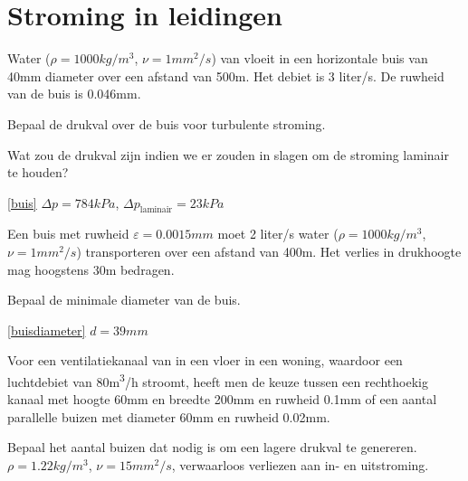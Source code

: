 \chapter{Stroming in leidingen}
\label{sec:Stroming in leidingen}
\begin{toepassing}
	\label{buis}
Water ($\rho=1000\unit{kg/m^3}$, $\nu=1\unit{mm^2/s}$) van vloeit in een horizontale buis van \unit{40}{mm} diameter over een afstand van 500m. Het debiet is 3 liter/s.  De ruwheid van de buis is 0.046mm.
		
Bepaal de drukval over de buis voor turbulente stroming.
		
Wat zou de drukval zijn indien we er zouden in slagen om de stroming laminair te houden?
\end{toepassing}
\begin{antwoord}{\ref{buis}}
	$\Delta p = 784\unit{kPa}$, $\Delta p_{\text{laminair}} = 23\unit{kPa}$
\end{antwoord}
\begin{toepassing}[*]
	\label{buisdiameter}
Een buis met ruwheid $\varepsilon = 0.0015\unit{mm}$ moet 2 liter/s water ($\rho=1000\unit{kg/m^3}$, $\nu=1\unit{mm^2/s}$) transporteren over een afstand van 400m.  Het verlies in drukhoogte mag hoogstens 30m bedragen.
		
Bepaal de minimale diameter van de buis.
\end{toepassing}
\begin{antwoord}{\ref{buisdiameter}}
	$d = 39\unit{mm}$
\end{antwoord}
\begin{toepassing}
	\label{ventilatiekanaal}
Voor een ventilatiekanaal van in een vloer in een woning, waardoor een luchtdebiet van 80\unit{m^3/h} stroomt, heeft men de keuze tussen een rechthoekig kanaal met hoogte 60mm en breedte 200mm en ruwheid 0.1mm of een aantal parallelle buizen met diameter 60mm en ruwheid 0.02mm. 
		
Bepaal het aantal buizen dat nodig is om een lagere drukval te genereren. $\rho = 1.22\unit{kg/m^3}$, $\nu = 15\unit{mm^2/s}$, verwaarloos verliezen aan in- en uitstroming.
\end{toepassing}
